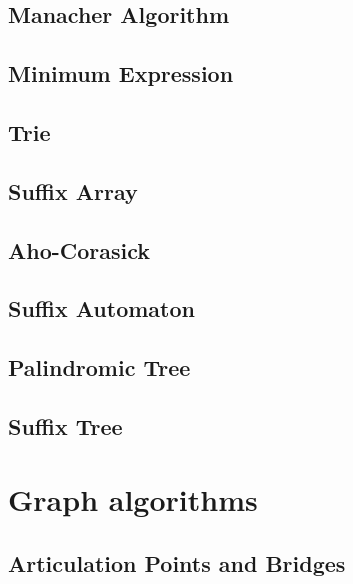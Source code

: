 \subsection{Manacher Algorithm}
\raggedbottom
\hrulefill
\subsection{Minimum Expression}
\raggedbottom
\hrulefill
\subsection{Trie}
\raggedbottom
\hrulefill
\subsection{Suffix Array}
\raggedbottom
\hrulefill
\subsection{Aho-Corasick}
\raggedbottom
\hrulefill
\subsection{Suffix Automaton}
\raggedbottom
\hrulefill
\subsection{Palindromic Tree}
\raggedbottom
\hrulefill
\subsection{Suffix Tree}
\raggedbottom
\hrulefill

\section{Graph algorithms}
\subsection{Articulation Points and Bridges}
\raggedbottom
\hrulefill
